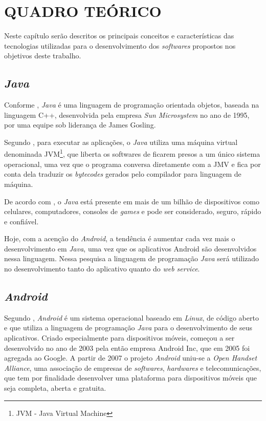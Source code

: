 \chapter{QUADRO TEÓRICO}

	\par Neste capítulo serão descritos os principais conceitos e características
das tecnologias utilizadas para o desenvolvimento dos \textit{softwares}
propostos nos objetivos deste trabalho.

\section{\textit{Java}}

	\par Conforme , \textit{Java} é uma linguagem de
programação orientada objetos, baseada na linguagem C++, desenvolvida pela
empresa \textit{Sun Microsystem} no ano de 1995, por uma equipe sob liderança
de James Gosling.

	\par Segundo , para executar as aplicações, o
\textit{Java} utiliza uma máquina virtual denominada JVM\footnote{JVM - Java
Virtual Machine}, que liberta os softwares de ficarem presos a um único sistema
operacional, uma vez que o programa conversa diretamente com a JMV e fica por
conta dela traduzir os \textit{bytecodes} gerados pelo compilador para
linguagem de máquina.

	\par De acordo com , o \textit{Java} está presente em mais de
um bilhão de dispositivos como celulares, computadores, consoles de
\textit{games} e pode ser considerado, seguro, rápido e confiável.

	\par Hoje, com a acenção do \textit{Android}, a tendência é aumentar cada vez
mais o desenvolvimento em \textit{Java}, uma vez que os aplicativos Android são
desenvolvidos nessa linguagem. Nessa pesquisa a linguagem de programação
\textit{Java} será utilizado no desenvolvimento tanto do aplicativo quanto do
\textit{web service}.

\section{\textit{Android}}

	\par Segundo , \textit{Android} é um sistema
operacional baseado em \textit{Linux}, de código aberto e que utiliza a
linguagem de programação \textit{Java} para o desenvolvimento de seus
aplicativos. Criado especialmente para dispositivos móveis, começou a
ser desenvolvido no ano de 2003 pela então empresa Android Inc, que em 2005 foi
agregada ao Google. A partir de 2007 o projeto \textit{Android} uniu-se a
\textit{Open Handset Alliance}, uma associação de empresas de
\textit{softwares}, \textit{hardwares} e telecomunicações, que tem por
finalidade desenvolver uma plataforma para dispositivos móveis que seja
completa, aberta e gratuita.

